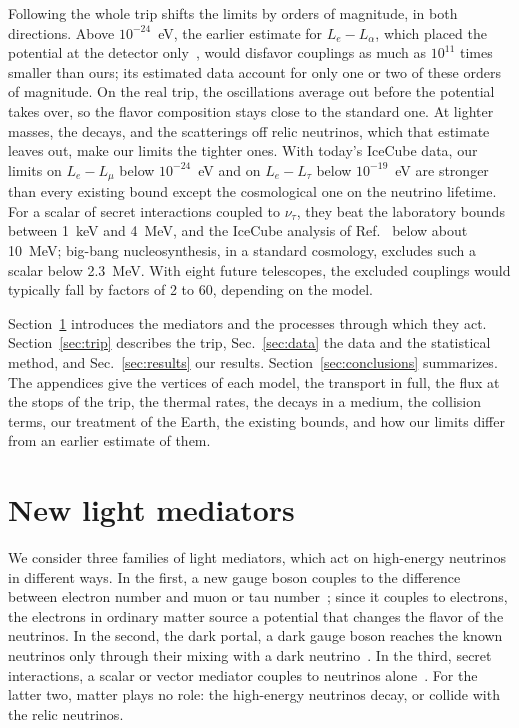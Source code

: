 \documentclass[linenumbers, aps, prd, twocolumn, superscriptaddress, floatfix, longbibliography, nofootinbib, bibnotes]{revtex4-2}
\begin{document}
Following the whole trip shifts the limits by orders of magnitude, in both directions.
Above $10^{-24}$~eV, the earlier estimate for $L_e - L_\alpha$, which placed the potential at the detector only~\cite{Agarwalla:2023sng}, would disfavor couplings as much as $10^{11}$ times smaller than ours; its estimated data account for only one or two of these orders of magnitude.
On the real trip, the oscillations average out before the potential takes over, so the flavor composition stays close to the standard one.
At lighter masses, the decays, and the scatterings off relic neutrinos, which that estimate leaves out, make our limits the tighter ones.
With today's IceCube data, our limits on $L_e - L_\mu$ below $10^{-24}$~eV and on $L_e - L_\tau$ below $10^{-19}$~eV are stronger than every existing bound except the cosmological one on the neutrino lifetime.
For a scalar of secret interactions coupled to $\nu_\tau$, they beat the laboratory bounds between 1~keV and 4~MeV, and the IceCube analysis of Ref.~\cite{Esteban:2021tub} below about 10~MeV; big-bang nucleosynthesis, in a standard cosmology, excludes such a scalar below 2.3~MeV.
With eight future telescopes, the excluded couplings would typically fall by factors of 2 to 60, depending on the model.

Section~\ref{sec:models} introduces the mediators and the processes through which they act.
Section~\ref{sec:trip} describes the trip, Sec.~\ref{sec:data} the data and the statistical method, and Sec.~\ref{sec:results} our results.
Section~\ref{sec:conclusions} summarizes.
The appendices give the vertices of each model, the transport in full, the flux at the stops of the trip, the thermal rates, the decays in a medium, the collision terms, our treatment of the Earth, the existing bounds, and how our limits differ from an earlier estimate of them.

\section{New light mediators}
\label{sec:models}

We consider three families of light mediators, which act on high-energy neutrinos in different ways.
In the first, a new gauge boson couples to the difference between electron number and muon or tau number~\cite{He:1990pn, Foot:1990mn, He:1991qd}; since it couples to electrons, the electrons in ordinary matter source a potential that changes the flavor of the neutrinos.
In the second, the dark portal, a dark gauge boson reaches the known neutrinos only through their mixing with a dark neutrino~\cite{Bertuzzo:2018itn, Jana:2026pwx}.
In the third, secret interactions, a scalar or vector mediator couples to neutrinos alone~\cite{Berryman:2022hds}.
For the latter two, matter plays no role: the high-energy neutrinos decay, or collide with the relic neutrinos.
\end{document}
